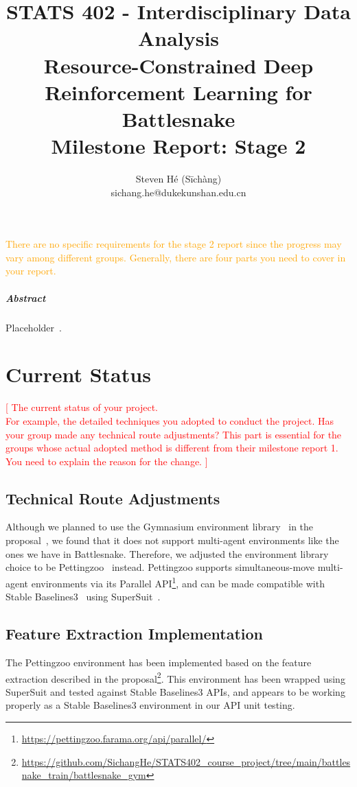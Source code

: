 \documentclass[a4paper]{article}
\title{STATS 402 - Interdisciplinary Data Analysis\\
    Resource-Constrained Deep Reinforcement Learning for Battlesnake\\
    Milestone Report: Stage 2
}
\author{Steven Hé (Sīchàng)\\
    sichang.he@dukekunshan.edu.cn
}
\newcommand{\todo}[1]{\textcolor{red}{[ #1 ]}}
\newcommand{\instruction}[1]{\textcolor{orange}{#1}}
\begin{document}
\maketitle

\instruction{
    There are no specific requirements for the stage 2 report since the progress may vary among different groups. Generally, there are four parts you need to cover in your report.
}

\subparagraph{Abstract}

Placeholder~\cite{battlesnake}.

\section{Current Status}

\todo{The current status of your project.\\
    For example, the detailed techniques you adopted to conduct the project. Has your group made any technical route adjustments? This part is essential for the groups whose actual adopted method is different from their milestone report 1. You need to explain the reason for the change.
}

\subsection{Technical Route Adjustments}

Although we planned to use the Gymnasium environment
library~\cite{farama2024gymnasium} in the proposal~\cite{proposal},
we found that it does not support multi-agent environments like the ones we have
in Battlesnake. Therefore,
we adjusted the environment library choice to be
Pettingzoo~\cite{terry2021pettingzoo} instead.
Pettingzoo supports simultaneous-move multi-agent environments via its Parallel
API\footnote{\url{https://pettingzoo.farama.org/api/parallel/}},
and can be made compatible with Stable Baselines3~\cite{raffin2024stable}
using SuperSuit~\cite{SuperSuit}.

\subsection{Feature Extraction Implementation }

The Pettingzoo environment has been implemented based on the feature extraction
described in the
proposal\footnote{\url{https://github.com/SichangHe/STATS402_course_project/tree/main/battlesnake_train/battlesnake_gym}}.
This environment has been wrapped using SuperSuit and tested against Stable
Baselines3 APIs,
and appears to be working properly as a Stable Baselines3 environment in our API
unit testing.
\end{document}
